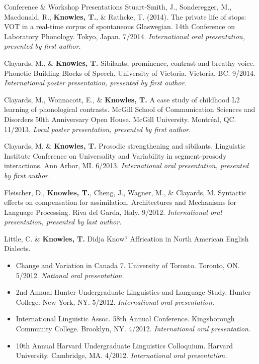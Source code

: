 \documentclass{resume} %
\begin{document}
\begin{rSection}{Conference \& Workshop Presentations}
	Stuart-Smith, J., Sonderegger, M., Macdonald, R., {\bf Knowles, T.}, \& Rathcke, T. (2014). The private life of stops: VOT in a real-time corpus of spontaneous Glaswegian. 14th Conference on Laboratory Phonology. Tokyo, Japan. 7/2014. \emph{International oral presentation, presented by first author.}
	
	Clayards, M., \& {\bf Knowles, T.} Sibilants, prominence, contrast and breathy voice. Phonetic Building Blocks of Speech. University of Victoria. Victoria, BC. 9/2014. \emph{International poster presentation, presented by first author.}
	
	Clayards, M., Wonnacott, E., \& {\bf Knowles, T.} A case study of childhood L2 learning of phonological contrasts. McGill School of Communication Sciences and Disorders 50th Anniversary Open House. McGill University. Montr\'eal, QC. 11/2013. \emph{Local poster presentation, presented by first author.}
	
	Clayards, M. \& {\bf Knowles, T.} Prosodic strengthening and sibilants. Linguistic Institute Conference on Universality and Variability in segment-prosody interactions. Ann Arbor, MI. 6/2013. \emph{International oral presentation, presented by first author.}
	
	
	Fleischer, D., {\bf Knowles, T.}, Cheng, J., Wagner, M., \& Clayards, M. Syntactic effects on compensation for assimilation. Architectures and Mechanisms for Language Processing. Riva del Garda, Italy. 9/2012. \emph{International oral presentation, presented by last author.}
	
	Little, C. \& {\bf Knowles, T.} Didja Know? Affrication in North American English Dialects.
	\begin{itemize}
				\renewcommand\labelitemi{$\cdot$}
		\item Change and Variation in Canada 7. University of Toronto. Toronto, ON. 5/2012. \emph{National oral presentation.}
		\item 2nd Annual Hunter Undergraduate Linguistics and Language Study. Hunter College. New York, NY. 5/2012. \emph{International oral presentation.}
		\item International Linguistic Assoc. 58th Annual Conference. Kingsborough Community College. Brooklyn, NY. 4/2012. \emph{International oral presentation.}
		\item 10th Annual Harvard Undergraduate Linguistics Colloquium. Harvard University. Cambridge, MA. 4/2012. \emph{International oral presentation.}
	\end{itemize}
	

\end{rSection}
\end{document}
